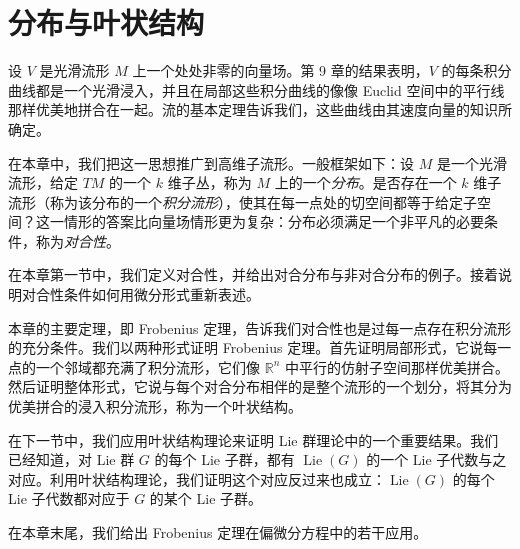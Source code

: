 \documentclass[../main.tex]{subfiles}
\begin{document}
\chapter{分布与叶状结构}\label{chapter:ch19-distributions-foliations}

设 $V$ 是光滑流形 $M$ 上一个处处非零的向量场。第 9 章的结果表明，$V$ 的每条积分曲线都是一个光滑浸入，并且在局部这些积分曲线的像像 Euclid 空间中的平行线那样优美地拼合在一起。流的基本定理告诉我们，这些曲线由其速度向量的知识所确定。

在本章中，我们把这一思想推广到高维子流形。一般框架如下：设 $M$ 是一个光滑流形，给定 $TM$ 的一个 $k$ 维子丛，称为 $M$ 上的一个\emph{分布}。是否存在一个 $k$ 维子流形（称为该分布的一个\emph{积分流形}），使其在每一点处的切空间都等于给定子空间？这一情形的答案比向量场情形更为复杂：分布必须满足一个非平凡的必要条件，称为\emph{对合性}。

在本章第一节中，我们定义对合性，并给出对合分布与非对合分布的例子。接着说明对合性条件如何用微分形式重新表述。

本章的主要定理，即 Frobenius 定理，告诉我们对合性也是过每一点存在积分流形的充分条件。我们以两种形式证明 Frobenius 定理。首先证明局部形式，它说每一点的一个邻域都充满了积分流形，它们像 $\mathbb{R}^n$ 中平行的仿射子空间那样优美拼合。然后证明整体形式，它说与每个对合分布相伴的是整个流形的一个划分，将其分为优美拼合的浸入积分流形，称为一个叶状结构。

在下一节中，我们应用叶状结构理论来证明 Lie 群理论中的一个重要结果。我们已经知道，对 Lie 群 $G$ 的每个 Lie 子群，都有 $\operatorname{Lie}(G)$ 的一个 Lie 子代数与之对应。利用叶状结构理论，我们证明这个对应反过来也成立：$\operatorname{Lie}(G)$ 的每个 Lie 子代数都对应于 $G$ 的某个 Lie 子群。

在本章末尾，我们给出 Frobenius 定理在偏微分方程中的若干应用。







\end{document}
